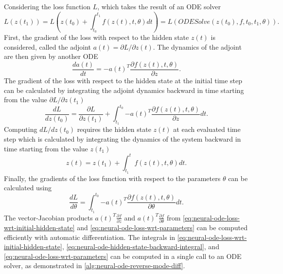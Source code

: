 Considering the loss function $L$, which takes the result of an \gls{ODE} solver \cite{chenNeuralOrdinaryDifferential2019}
\begin{equation}
    L(z(t_1)) = L\left(z(t_0) + \int_{t_0}^{t_1}{f(z(t), t, \theta)dt}\right) = L(ODESolve(z(t_0), f, t_0, t_1, \theta)).
\end{equation}
First, the gradient of the loss with respect to the hidden state $z(t)$ is considered, called the adjoint $a(t) = \partial L / \partial z(t)$.
The dynamics of the adjoint are then given by another \gls{ODE} \cite{chenNeuralOrdinaryDifferential2019}
\begin{equation}
    \frac{da(t)}{dt} = -a(t)^T\frac{\partial f(z(t), t, \theta)}{\partial z}.
\end{equation}
The gradient of the loss with respect to the hidden state at the initial time step can be calculated by integrating the adjoint dynamics backward in time starting from the value $\partial L / \partial z(t_1)$ \cite{chenNeuralOrdinaryDifferential2019}
\begin{equation}
    \frac{dL}{dz(t_0)} = \frac{\partial L}{\partial z(t_1)} + \int_{t_1}^{t_0}{-a(t)^T\frac{\partial f(z(t), t, \theta)}{\partial z}} dt.
    \label{eq:neural-ode-loss-wrt-initial-hidden-state}
\end{equation}
Computing $dL/dz(t_0)$ requires the hidden state $z(t)$ at each evaluated time step which is calculated by integrating the dynamics of the system backward in time starting from the value $z(t_1)$ \cite{chenNeuralOrdinaryDifferential2019}
\begin{equation}
    z(t) = z(t_1) + \int_{t_1}^{t}{f(z(t), t, \theta)dt}.
    \label{eq:neural-ode-hidden-state-backward-integral}
\end{equation}
Finally, the gradients of the loss function with respect to the parameters $\theta$ can be calculated using \cite{chenNeuralOrdinaryDifferential2019}
\begin{equation}
    \frac{dL}{d\theta} = \int_{t_1}^{t_0}{-a(t)^T\frac{\partial f(z(t), t, \theta)}{\partial \theta}} dt.
    \label{eq:neural-ode-loss-wrt-parameters}
\end{equation}
The vector-Jacobian products $a(t)^T\frac{\partial f}{\partial z}$ and $a(t)^T\frac{\partial f}{\partial \theta}$ from \autoref{eq:neural-ode-loss-wrt-initial-hidden-state} and \autoref{eq:neural-ode-loss-wrt-parameters} can be computed efficiently with automatic differentiation.
The integrals in \autoref{eq:neural-ode-loss-wrt-initial-hidden-state}, \autoref{eq:neural-ode-hidden-state-backward-integral}, and \autoref{eq:neural-ode-loss-wrt-parameters} can be computed in a single call to an \gls{ODE} solver, as demonstrated in \autoref{alg:neural-ode-reverse-mode-diff}.